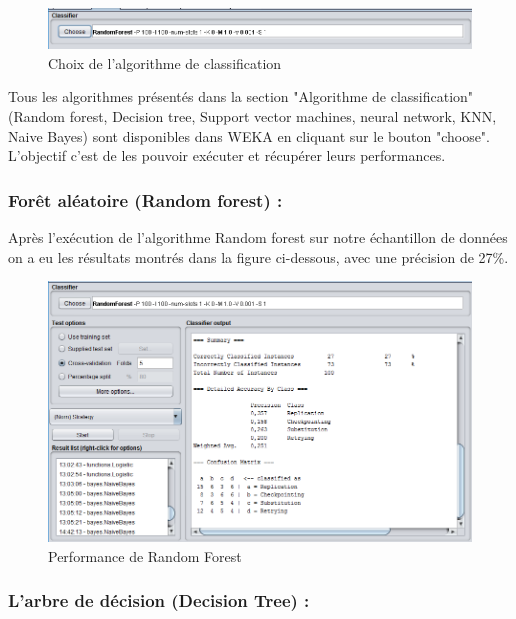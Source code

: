 \begin{figure}[H]
\begin{center}
\includegraphics[width=1\linewidth]{images/algorithme.PNG}
\end{center}
\caption{Choix de l'algorithme de classification}
\label{fig:15}
\end{figure}

Tous les algorithmes présentés dans la section "Algorithme de classification"  (Random forest, Decision tree, Support vector machines, neural network, KNN, Naive Bayes) sont disponibles dans WEKA en cliquant sur le bouton "choose". L'objectif c'est de les pouvoir exécuter et récupérer leurs performances.

\subsubsection{Forêt aléatoire (Random forest) :}

Après l'exécution de l'algorithme Random forest sur notre échantillon de données on a eu les résultats montrés dans la figure ci-dessous, avec une précision de 27\%.

\begin{figure}[H]
\begin{center}
\includegraphics[width=0.8\linewidth]{images/perfRF.PNG}
\end{center}
\caption{Performance de Random Forest}
\label{fig:16}
\end{figure}


\subsubsection{L'arbre de décision (Decision Tree) :}

